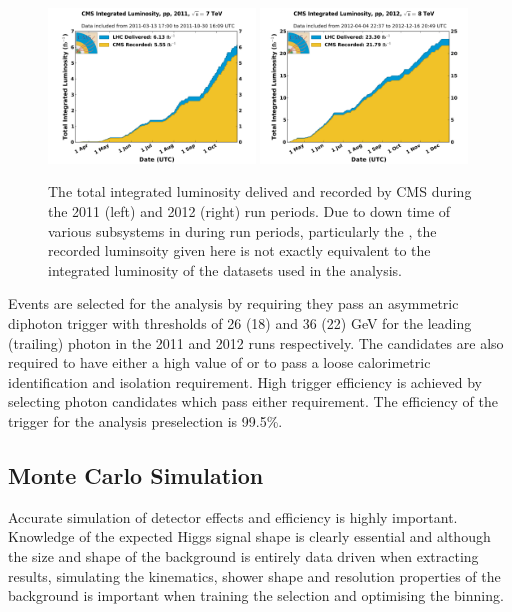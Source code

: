 \begin{figure}
  \includegraphics[width=0.49\textwidth]{analysis_comps/plots/int_lumi_2011.pdf}
  \includegraphics[width=0.49\textwidth]{analysis_comps/plots/int_lumi_2012.pdf}
  \caption[The total integrated luminosity delivered and recorded by CMS during the 2011 and 2012 run periods]{The total integrated luminosity delived and recorded by CMS during the 2011 (left) and 2012 (right) run periods. Due to down time of various subsystems in \CMS during run periods, particularly the \ECAL, the recorded luminsoity given here is not exactly equivalent to the integrated luminosity of the datasets used in the analysis.}
  \label{fig:intlumi}
\end{figure}

Events are selected for the analysis by requiring they pass an asymmetric diphoton trigger with \ET thresholds of 26 (18) and 36 (22) GeV for the leading (trailing) photon in the 2011 and 2012 runs respectively. The candidates are also required to have either a high value of \rnine or to pass a loose calorimetric identification and isolation requirement. High trigger efficiency is achieved by selecting photon candidates which pass either requirement. The efficiency of the trigger for the analysis preselection is 99.5\%.

\subsection{Monte Carlo Simulation}
\label{sec:mc}

Accurate simulation of detector effects and efficiency is highly important. Knowledge of the expected Higgs signal shape is clearly essential and although the size and shape of the \mgg background is entirely data driven when extracting results, simulating the kinematics, shower shape and resolution properties of the background is important when training the selection and optimising the binning. 

